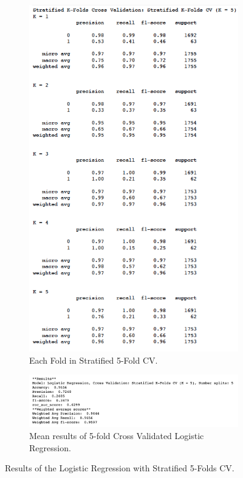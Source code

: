 \documentclass[11pt]{article}
\begin{document}
\begin{itemize}
\begin{figure}[h!]
\centering
\begin{subfigure}{0.5\textwidth}
         \centering
         \includegraphics[width=\textwidth]{clf_logistic_5fold.png}
         \caption{Each Fold in Stratified 5-Fold CV.}
         \label{fig:clf_logistic_5fold}
\end{subfigure}
\hfill
\begin{subfigure}{0.6\textwidth}
         \centering
         \includegraphics[width=\textwidth]{clf_logistic_5fold_result.png}
         \caption{Mean results of 5-fold Cross Validated Logistic Regression.}
         \label{fig:clf_logistic_5fold_result}
\end{subfigure}
\caption{Results of the Logistic Regression with Stratified 5-Folds CV.}
\label{fig:clf_logistic_5fold}
\end{figure}
\end{itemize}
\end{document}
